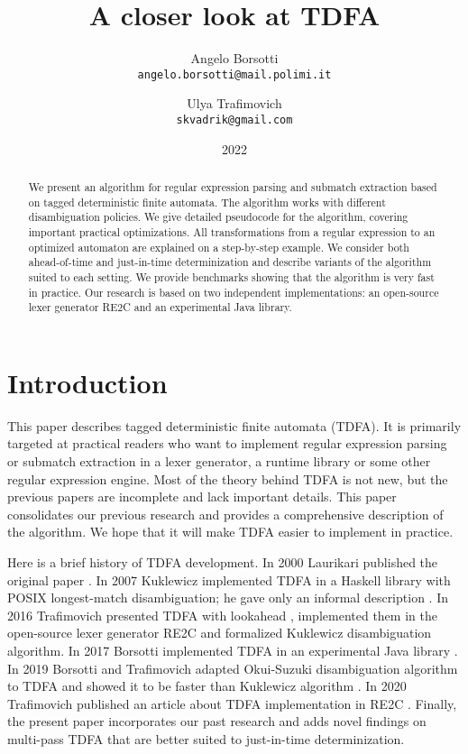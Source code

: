 \documentclass[]{article}
\begin{document}
\title{A closer look at TDFA}
\author{
    Angelo Borsotti \\
    \texttt{\small{angelo.borsotti@mail.polimi.it}}
\and
    Ulya Trafimovich \\
    \texttt{\small{skvadrik@gmail.com}}
}
\date{2022}

\maketitle

\begin{abstract}
We present an algorithm for regular expression parsing and submatch extraction
based on tagged deterministic finite automata.
The algorithm works with different disambiguation policies.
We give detailed pseudocode for the algorithm, covering important practical optimizations.
All transformations from a regular expression to an optimized automaton are explained on a step-by-step example.
We consider both ahead-of-time and just-in-time determinization
and describe variants of the algorithm suited to each setting.
We provide benchmarks showing that the algorithm is very fast in practice.
Our research is based on two independent implementations:
an open-source lexer generator RE2C
and an experimental Java library.
\end{abstract}

\section*{Introduction}
This paper describes tagged deterministic finite automata (TDFA).
It is primarily targeted at practical readers who want to implement regular expression parsing or submatch extraction
in a lexer generator, a runtime library or some other regular expression engine.
Most of the theory behind TDFA is not new, but the previous papers are incomplete and lack important details.
This paper consolidates our previous research
and provides a comprehensive description of the algorithm.
We hope that it will make TDFA easier to implement in practice.
\medskip

%
Here is a brief history of TDFA development.
In 2000 Laurikari published the original paper \cite{Lau00}.
In 2007 Kuklewicz implemented TDFA in a Haskell library with POSIX longest-match disambiguation;
he gave only an informal description \cite{Kuk07}.
In 2016 Trafimovich presented TDFA with lookahead \cite{Tro17},
implemented them in the open-source lexer generator RE2C \cite{RE2C}
and formalized Kuklewicz disambiguation algorithm.
In 2017 Borsotti implemented TDFA in an experimental Java library \cite{RE2CJava}.
In 2019 Borsotti and Trafimovich adapted Okui-Suzuki disambiguation algorithm to TDFA
and showed it to be faster than Kuklewicz algorithm \cite{BorTro19}.
In 2020 Trafimovich published an article about TDFA implementation in RE2C \cite{Tro20}.
%
Finally, the present paper incorporates our past research
and adds novel findings on multi-pass TDFA that are better suited to just-in-time determinization.
\medskip
\end{document}
